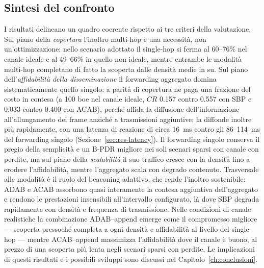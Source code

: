 \subsection{Sintesi del confronto}
\label{sec:confronto-sintesi}
I risultati delineano un quadro coerente rispetto ai tre criteri della valutazione.
Sul piano della \emph{copertura} l'inoltro multi-hop \`e una necessit\`a, non
un'ottimizzazione: nello scenario adottato il single-hop si ferma al 60--76\%
nel canale ideale e al 49--66\% in quello non ideale, mentre entrambe le
modalit\`a multi-hop completano di fatto la scoperta dalle densit\`a medie in
su. Sul piano dell'\emph{affidabilit\`a della disseminazione} il forwarding aggregato domina
sistematicamente quello singolo: a parit\`a di copertura ne paga una frazione
del costo in contesa (a 100 boe nel canale ideale, $CR$ 0.157 contro 0.557
con SBP e 0.033 contro 0.400 con ACAB), perch\'e affida la diffusione
dell'informazione all'allungamento dei frame anzich\'e a trasmissioni
aggiuntive; la diffonde inoltre pi\`u rapidamente, con una latenza di
reazione di circa \SI{16}{ms} contro gli 86--114~\si{ms} del forwarding
singolo (Sezione~\ref{sec:res-latency}). Il forwarding singolo conserva il pregio della semplicit\`a e un
B-PDR migliore nei soli scenari sparsi con canale con perdite, ma sul piano
della \emph{scalabilit\`a} il suo traffico cresce con la densit\`a fino a
erodere l'affidabilit\`a, mentre l'aggregato scala con degrado contenuto.
Trasversale alle modalit\`a \`e il ruolo del beaconing adattivo, che rende
l'inoltro sostenibile: ADAB e ACAB assorbono quasi interamente la contesa
aggiuntiva dell'aggregato e rendono le prestazioni insensibili all'intervallo
configurato, l\`a dove SBP degrada rapidamente con densit\`a e frequenza di
trasmissione. Nelle condizioni di canale realistiche la combinazione
ADAB--append emerge come il compromesso migliore --- scoperta pressoch\'e
completa a ogni densit\`a e affidabilit\`a al livello del single-hop ---
mentre ACAB--append massimizza l'affidabilit\`a dove il canale \`e buono, al
prezzo di una scoperta pi\`u lenta negli scenari sparsi con perdite. Le
implicazioni di questi risultati e i possibili sviluppi sono discussi nel
Capitolo~\ref{ch:conclusioni}.
